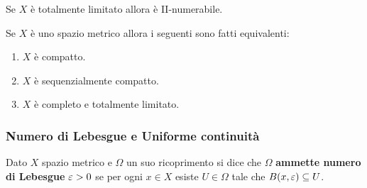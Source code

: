 \begin{multicols*}{2}
\begin{proposition}\label{TotalmenteLimitatoImplicaIINumerabile}
Se $X$ è totalmente limitato allora è II-numerabile.
\end{proposition}

\begin{theorem}\label{CaratterizzazioneCompattiInMetrico}
Se $X$ è uno spazio metrico allora i seguenti sono fatti equivalenti:
\begin{enumerate}[noitemsep]
\item $X$ è compatto.
\item $X$ è sequenzialmente compatto.
\item $X$ è completo e totalmente limitato.
\end{enumerate}
\end{theorem}



\subsubsection{Numero di Lebesgue e Uniforme continuità}
\begin{definition}
Dato $X$ spazio metrico e $\Omega$ un suo ricoprimento si dice che $\Omega$ \textbf{ammette numero di Lebesgue} $\varepsilon>0$ se per ogni $x\in X$ esiste $U\in\Omega$ tale che $B(x,\varepsilon)\subseteq U$.
\end{definition}


\end{multicols*}
